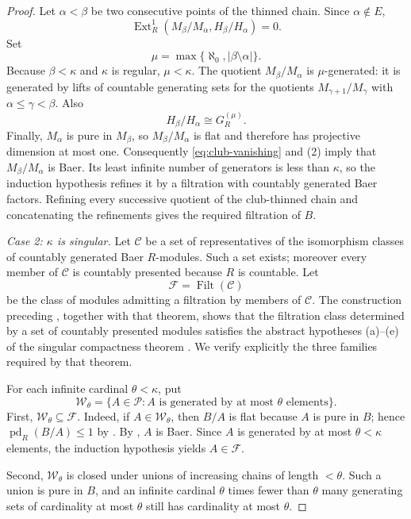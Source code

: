 \documentclass[11pt]{article}
\theoremstyle{definition}
\theoremstyle{remark}
\newcommand{\pd}{\operatorname{pd}}
\newcommand{\Ext}{\operatorname{Ext}}
\begin{document}
\begin{proof}
Let $\alpha<\beta$ be two consecutive points of the thinned chain.  Since
$\alpha\notin E$,
\begin{equation}\label{eq:club-vanishing}
 \Ext_R^1(M_\beta/M_\alpha,H_\beta/H_\alpha)=0.
\end{equation}
Set
\[
 \mu=\max\{\aleph_0,|\beta\setminus\alpha|\}.
\]
Because $\beta<\kappa$ and $\kappa$ is regular, $\mu<\kappa$.  The quotient
$M_\beta/M_\alpha$ is $\mu$-generated: it is generated by lifts of countable
generating sets for the quotients $M_{\gamma+1}/M_\gamma$ with
$\alpha\le\gamma<\beta$.  Also
\[
 H_\beta/H_\alpha\cong G_R^{(\mu)}.
\]
Finally, $M_\alpha$ is pure in $M_\beta$, so $M_\beta/M_\alpha$ is flat and
therefore has projective dimension at most one.  Consequently
\eqref{eq:club-vanishing} and (2) imply that
$M_\beta/M_\alpha$ is Baer.  Its least infinite number of generators is less
than $\kappa$, so the induction hypothesis refines it by a filtration with
countably generated Baer factors.  Refining every successive quotient of the
club-thinned chain and concatenating the refinements gives the required
filtration of $B$.

\smallskip
\noindent\emph{Case 2: $\kappa$ is singular.}
Let $\mathcal C$ be a set of representatives of the isomorphism classes of
countably generated Baer $R$-modules.  Such a set exists; moreover every
member of $\mathcal C$ is countably presented because $R$ is countable.  Let
\[
 \mathcal F=\operatorname{Filt}(\mathcal C)
\]
be the class of modules admitting a filtration by members of $\mathcal C$.
The construction preceding \cite[Theorem~11]{EFS}, together with that theorem,
shows that the filtration class determined by a set of countably presented
modules satisfies the abstract hypotheses (a)--(e) of the singular
compactness theorem \cite[Theorem~10]{EFS}.  We verify explicitly the three
families required by that theorem.

For each infinite cardinal $\theta<\kappa$, put
\[
 \mathscr W_\theta=
 \{A\in\mathscr P: A\text{ is generated by at most }\theta\text{ elements}\}.
\]
First, $\mathscr W_\theta\subseteq\mathcal F$.  Indeed, if
$A\in\mathscr W_\theta$, then $B/A$ is flat because $A$ is pure in $B$; hence
$\pd_R(B/A)\le1$ by .  By , $A$ is Baer.
Since $A$ is generated by at most $\theta<\kappa$ elements, the induction
hypothesis yields $A\in\mathcal F$.

Second, $\mathscr W_\theta$ is closed under unions of increasing chains of
length $<\theta$.  Such a union is pure in $B$, and an infinite cardinal
$\theta$ times fewer than $\theta$ many generating sets of cardinality at
most $\theta$ still has cardinality at most $\theta$.


\end{proof}
\end{document}
